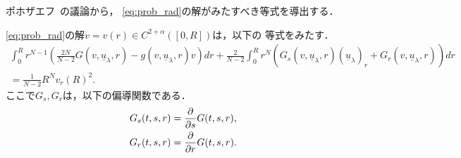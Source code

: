 ポホザエフ\cite{MR0192184}~の議論から，
\eqref{eq:prob_rad}の解がみたすべき等式を導出する．

\begin{lem}
 \eqref{eq:prob_rad}の解$v = v(r) \in C^{2+\alpha}([0, R])$は，以下の
 等式をみたす．
 \begin{multline}
  \int_0^R r^{N-1} \left( \frac{2N}{N-2} G(v, \underline{u}_\lambda,
  r) - g(v, \underline{u}_\lambda, r) v \right) dr
  + \frac{2}{N-2} \int_0^R r^N \left( G_s(v, \underline{u}_\lambda, r)
  (\underline{u}_\lambda)_r + G_r(v, \underline{u}_\lambda, r)
  \right) dr \\ = \frac{1}{N-2} R^N v_r(R)^2. \label{eq:poh_eq}
 \end{multline}
 ここで$G_s, G_r$は，以下の偏導関数である．
 \begin{align*}
  G_s(t, s, r) &= \frac{\partial }{\partial s} G(t, s, r), \\
  G_r(t, s, r) &= \frac{\partial }{\partial r} G(t, s, r).
 \end{align*}
\end{lem}

